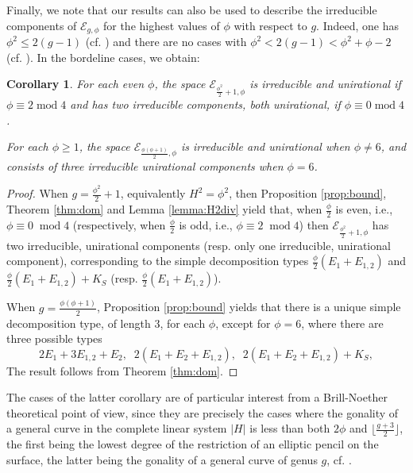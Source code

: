 \documentclass[11pt]{amsart}
\newtheorem{corollary}[thm]{Corollary}
\theoremstyle{definition}
\def\E{{\mathcal E}}
\begin{document}
 Finally, we note that 
our results can also be used to describe the
irreducible components of $\E_{g,\phi}$ for the highest values of
$\phi$ with respect to $g$. Indeed, one has $\phi^2 \leqslant 2(g-1)$
(cf. \cite[Cor. 2.7.1]{cd}) and there are no cases with $\phi^2 <
2(g-1) < \phi^2 +\phi-2$ (cf. \cite[Prop. 1.4]{KL1}). In the bordeline
cases, we obtain:

\begin{corollary} \label{cor:main3}
  For each even $\phi$, the space $\E_{\frac{\phi^2}{2}+1,\phi}$ 
is irreducible and unirational if $ \phi \equiv 2 \; \mbox{mod} \; 4$ and
has two  irreducible  components, both unirational, if $ \phi \equiv 0 \; \mbox{mod} \; 4$.

For each $\phi \geqslant 1$, the space $\E_{\frac{\phi(\phi+1)}{2},\phi}$ is irreducible and unirational when $\phi \neq 6$, and consists of three  irreducible  unirational components when $\phi=6$. 
\end{corollary}


















\begin{proof}
  When $g=\frac{\phi^2}{2}+1$, equivalently $H^2=\phi^2$, then Proposition \ref{prop:bound}, Theorem \ref{thm:dom} and Lemma 
\ref{lemma:H2div}  yield that, when $\frac{\phi}{2}$ is even, i.e., $\phi\equiv 0\;\; \mbox{mod} \; 4$ (respectively, when $\frac{\phi}{2}$ is odd, i.e., $\phi\equiv 2\;\; \mbox{mod} \; 4$) then $\E_{\frac{\phi^2}{2}+1,\phi}$ has two irreducible, unirational components (resp. only one irreducible, unirational component), corresponding to the simple decomposition types $\frac{\phi}{2}\left(E_1+E_{1,2}\right)$ and 
$\frac{\phi}{2}\left(E_1+E_{1,2}\right)+K_S$ (resp. $\frac{\phi}{2}\left(E_1+E_{1,2}\right)$). 

When $g=\frac{\phi(\phi+1)}{2}$, Proposition \ref{prop:bound} yields that there is a unique simple decomposition type, of length $3$, 
for each $\phi$, except  for $\phi=6$, where there are three possible types
\[ 2E_1+3E_{1,2}+E_2, \; \; 2(E_1+E_2+E_{1,2}), \; \; 2(E_1+E_2+E_{1,2})+K_S,\]
The result follows from Theorem  \ref{thm:dom}.    
\end{proof}

The cases of the latter corollary are of particular interest from a Brill-Noether theoretical point of view, since they are precisely the cases where the gonality of a general curve in the complete linear system $|H|$ is less than both $2\phi$ and $\lfloor \frac{g+3}{2} \rfloor$, the first being the lowest degree of the restriction of an elliptic pencil on the surface, the latter being the gonality of a general curve of genus $g$, cf. \cite[Cor. 1.5]{KL1}. 
\end{document}
